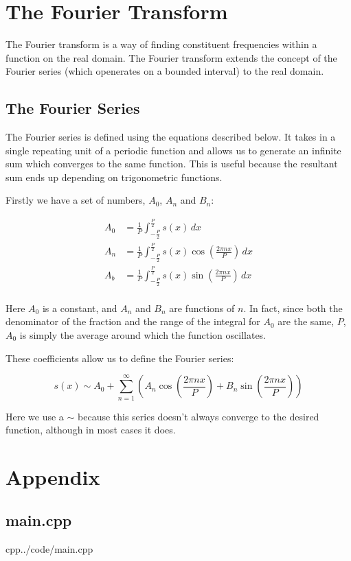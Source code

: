 \documentclass{article}
\begin{document}
\section{The Fourier Transform}

The Fourier transform is a way of finding constituent frequencies within a function on the real domain.
The Fourier transform extends the concept of the Fourier series (which openerates on a bounded interval) to the real
domain.

\subsection{The Fourier Series}

The Fourier series is defined using the equations described below.
It takes in a single repeating unit of a periodic function and allows us to generate an infinite sum which converges
to the same function. This is useful because the resultant sum ends up depending on trigonometric functions.

Firstly we have a set of numbers, \(A_0\), \(A_n\) and \(B_n\):

\begin{equation}
\begin{aligned}
	A_0 &= \frac{1}{P} \int_{-\frac{P}{2}}^{\frac{P}{2}}
		s(x) \,dx \\
	A_n &= \frac{1}{P} \int_{-\frac{P}{2}}^{\frac{P}{2}}
		s(x) \cos \left(\frac{2\pi nx}{P}\right) \,dx \\
	A_b &= \frac{1}{P} \int_{-\frac{P}{2}}^{\frac{P}{2}}
		s(x) \sin \left(\frac{2\pi nx}{P}\right) \,dx \\
\end{aligned}
\end{equation}

Here \(A_0\) is a constant, and \(A_n\) and \(B_n\) are functions of \(n\).
In fact, since both the denominator of the fraction and the range of the integral for \(A_0\) are the same, \(P\),
\(A_0\) is simply the average around which the function oscillates.

These coefficients allow us to define the Fourier series:

\begin{equation}
	s(x) \sim A_0 + \sum_{n=1}^{\infty} \left(
		A_n \cos \left( \frac{2\pi nx}{P} \right) +
		B_n \sin \left( \frac{2\pi nx}{P} \right)
	\right)
\end{equation}

Here we use a \(\sim\) because this series doesn't always converge to the desired function, although in most cases it
does.

\cite[p. 150]{nixon:2019}
\cite{thompson:1961}
\cite{lestrel:1997}
\cite{cartwright:1990}
\cite{dryden:2016}




\section*{Appendix}

\subsection*{main.cpp}

\begin{inputminted}{cpp}{../code/main.cpp}
\end{inputminted}
\end{document}
